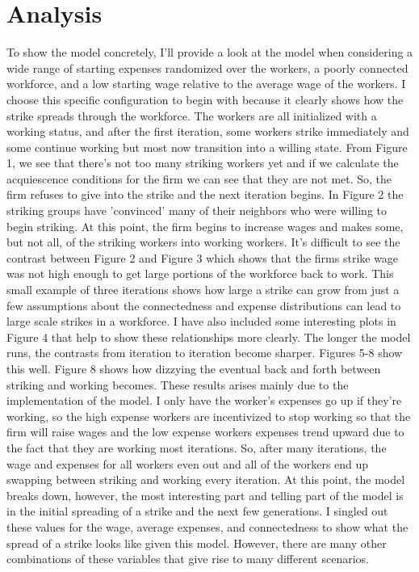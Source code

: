 \documentclass[11pt]{article}
\begin{document}
\section{Analysis} \hrulefill

To show the model concretely, I'll provide a look at the model when considering a wide range of starting expenses randomized over the workers, a poorly connected workforce, and a low starting wage relative to the average wage of the workers. I choose this specific configuration to begin with because it clearly shows how the strike spreads through the workforce. The workers are all initialized with a working status, and after the first iteration, some workers strike immediately and some continue working but most now transition into a willing state.  From Figure 1, we see that there's not too many striking workers yet and if we calculate the acquiescence conditions for the firm we can see that they are not met. So, the firm refuses to give into the strike and the next iteration begins. In Figure 2 the striking groups have 'convinced' many of their neighbors who were willing to begin striking. At this point, the firm begins to increase wages and makes some, but not all, of the striking workers into working workers. It's difficult to see the contrast between Figure 2 and Figure 3 which shows that the firms strike wage was not high enough to get large portions of the workforce back to work. This small example of three iterations shows how large a strike can grow from just a few assumptions about the connectedness and expense distributions can lead to large scale strikes in a workforce. I have also included some interesting plots in Figure 4 that help to show these relationships more clearly. 
The longer the model runs, the contrasts from iteration to iteration become sharper. Figures 5-8 show this well. Figure 8 shows how dizzying the eventual back and forth between striking and working becomes. These results arises mainly due to the implementation of the model. I only have the worker's expenses go up if they're working, so the high expense workers are incentivized to stop working so that the firm will raise wages and the low expense workers expenses trend upward due to the fact that they are working most iterations. So, after many iterations, the wage and expenses for all workers even out and all of the workers end up swapping between striking and working every iteration. At this point, the model breaks down, however, the most interesting part and telling part of the model is in the initial spreading of a strike and the next few generations. 
I singled out these values for the wage, average expenses, and connectedness to show what the spread of a strike looks like given this model. However, there are many other combinations of these variables that give rise to many different scenarios. 
\end{document}

